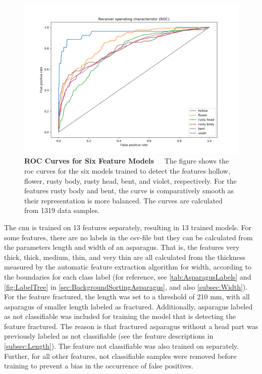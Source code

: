 \begin{figure}[!htb]
	\centering
	\includegraphics[scale=0.6]{Figures/chapter04/singellabelROC.png}
	\decoRule
	\caption[Single-Label CNN ROC Curve]{\textbf{ROC Curves for Six Feature Models}~~~The figure shows the \acrshort{roc} curves for the six models trained to detect the features hollow, flower, rusty body, rusty head, bent, and violet, respectively. For the features rusty body and bent, the curve is comparatively smooth as their representation is more balanced. The curves are calculated from 1319 data samples.}
	\label{fig:SingleLabelROC}
\end{figure}

The \acrshort{cnn} is trained on 13 features separately, resulting in 13 trained models. For some features, there are no labels in the csv-file but they can be calculated from the parameters length and width of an asparagus. That is, the features very thick, thick, medium, thin, and very thin are all calculated from the thickness measured by the automatic feature extraction algorithm for width, according to the boundaries for each class label (for reference, see \autoref{tab:AsparagusLabels} and \autoref{fig:LabelTree} in \autoref{sec:BackgroundSortingAsparagus}, and also \autoref{subsec:Width}). For the feature fractured, the length was set to a threshold of 210 mm, with all asparagus of smaller length labeled as fractured. Additionally, asparagus labeled as not classifiable was included for training the model that is detecting the feature fractured. The reason is that fractured asparagus without a head part was previously labeled as not classifiable (see the feature descriptions in \autoref{subsec:Length}). The feature not classifiable was also trained on separately. Further, for all other features, not classifiable samples were removed before training to prevent a bias in the occurrence of false positives.

